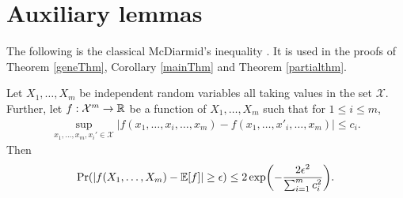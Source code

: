 \section{Auxiliary lemmas}

The following is the classical McDiarmid's inequality \cite{McDiarmid1989}. It is used in the proofs of Theorem \ref{geneThm}, Corollary \ref{mainThm} and Theorem  \ref{partialthm}.
\begin{lemma}
	Let $ X_1,\ldots,X_m $ be independent random variables all taking values in the set $ \mathcal{X}.$ Further, let $ f:\mathcal{X}^m\to \operatorname{\mathbb{R}} $ be a
	function of $ X_1,\ldots,X_m $ such that for $1\leq i\leq m$, %
	\begin{align}\label{boundeddiff}
	\sup_{x_1,\ldots,x_m,x_i'\in\mathcal{X}}|f(x_1,\ldots,x_i,\ldots,x_m) - f(x_1,\ldots,x'_i,\ldots,x_m)| \leq c_i .
	\end{align}
	Then
	\[
	\Pr(|f(X_1,\ldots,X_m)-\E[f]| \geq \epsilon) \leq 2\exp\left(-\frac{2\epsilon^2}{\sum_{i=1}^{m}c_i^2}\right).
	\]
\end{lemma}

